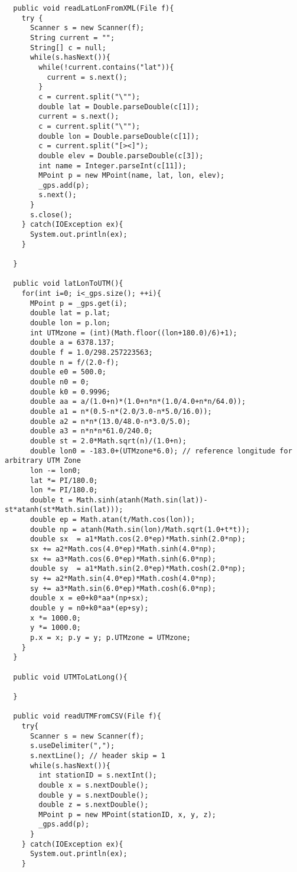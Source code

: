 \documentclass[11pt]{article}
\begin{document}
\begin{enumerate}
\begin{lstlisting}
  public void readLatLonFromXML(File f){
    try {
      Scanner s = new Scanner(f);
      String current = "";
      String[] c = null;
      while(s.hasNext()){
        while(!current.contains("lat")){
          current = s.next();
        }
        c = current.split("\"");
        double lat = Double.parseDouble(c[1]);
        current = s.next();
        c = current.split("\"");
        double lon = Double.parseDouble(c[1]);
        c = current.split("[><]");
        double elev = Double.parseDouble(c[3]);
        int name = Integer.parseInt(c[11]);
        MPoint p = new MPoint(name, lat, lon, elev);
        _gps.add(p);
        s.next();
      }
      s.close();
    } catch(IOException ex){
      System.out.println(ex);
    }
    
  }

  public void latLonToUTM(){
    for(int i=0; i<_gps.size(); ++i){
      MPoint p = _gps.get(i);
      double lat = p.lat;
      double lon = p.lon;
      int UTMzone = (int)(Math.floor((lon+180.0)/6)+1);
      double a = 6378.137;
      double f = 1.0/298.257223563;
      double n = f/(2.0-f);
      double e0 = 500.0;
      double n0 = 0;
      double k0 = 0.9996;
      double aa = a/(1.0+n)*(1.0+n*n*(1.0/4.0+n*n/64.0));
      double a1 = n*(0.5-n*(2.0/3.0-n*5.0/16.0));
      double a2 = n*n*(13.0/48.0-n*3.0/5.0);
      double a3 = n*n*n*61.0/240.0;
      double st = 2.0*Math.sqrt(n)/(1.0+n);
      double lon0 = -183.0+(UTMzone*6.0); // reference longitude for arbitrary UTM Zone
      lon -= lon0;
      lat *= PI/180.0;
      lon *= PI/180.0;
      double t = Math.sinh(atanh(Math.sin(lat))-st*atanh(st*Math.sin(lat)));
      double ep = Math.atan(t/Math.cos(lon));
      double np = atanh(Math.sin(lon)/Math.sqrt(1.0+t*t));
      double sx  = a1*Math.cos(2.0*ep)*Math.sinh(2.0*np);
      sx += a2*Math.cos(4.0*ep)*Math.sinh(4.0*np);
      sx += a3*Math.cos(6.0*ep)*Math.sinh(6.0*np);
      double sy  = a1*Math.sin(2.0*ep)*Math.cosh(2.0*np);
      sy += a2*Math.sin(4.0*ep)*Math.cosh(4.0*np);
      sy += a3*Math.sin(6.0*ep)*Math.cosh(6.0*np);
      double x = e0+k0*aa*(np+sx);
      double y = n0+k0*aa*(ep+sy);
      x *= 1000.0;
      y *= 1000.0;
      p.x = x; p.y = y; p.UTMzone = UTMzone;
    }
  }

  public void UTMToLatLong(){
    
  }
  
  public void readUTMFromCSV(File f){
    try{
      Scanner s = new Scanner(f);
      s.useDelimiter(",");
      s.nextLine(); // header skip = 1
      while(s.hasNext()){
        int stationID = s.nextInt();
        double x = s.nextDouble();
        double y = s.nextDouble();
        double z = s.nextDouble();
        MPoint p = new MPoint(stationID, x, y, z);
        _gps.add(p);
      }
    } catch(IOException ex){
      System.out.println(ex);
    }
    

\end{lstlisting}
\end{enumerate}
\end{document}

